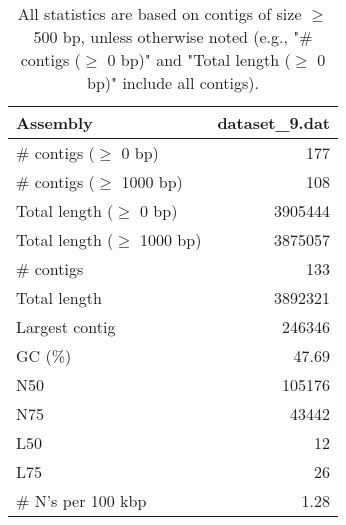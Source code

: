 \documentclass[12pt,a4paper]{article}
\begin{document}
\begin{table}[ht]
\begin{center}
\caption{All statistics are based on contigs of size $\geq$ 500 bp, unless otherwise noted (e.g., "\# contigs ($\geq$ 0 bp)" and "Total length ($\geq$ 0 bp)" include all contigs).}
\begin{tabular}{|l*{1}{|r}|}
\hline
Assembly & dataset\_9.dat \\ \hline
\# contigs ($\geq$ 0 bp) & 177 \\ \hline
\# contigs ($\geq$ 1000 bp) & 108 \\ \hline
Total length ($\geq$ 0 bp) & 3905444 \\ \hline
Total length ($\geq$ 1000 bp) & 3875057 \\ \hline
\# contigs & 133 \\ \hline
Total length & 3892321 \\ \hline
Largest contig & 246346 \\ \hline
GC (\%) & 47.69 \\ \hline
N50 & 105176 \\ \hline
N75 & 43442 \\ \hline
L50 & 12 \\ \hline
L75 & 26 \\ \hline
\# N's per 100 kbp & 1.28 \\ \hline
\end{tabular}
\end{center}
\end{table}
\end{document}

